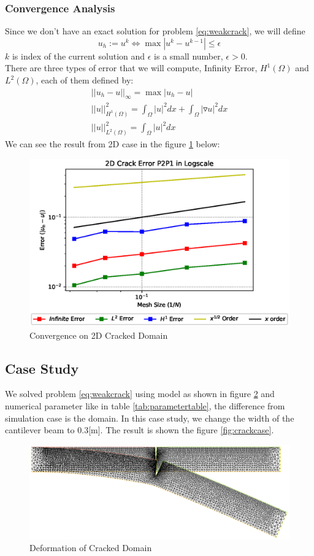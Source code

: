 \documentclass[a4paper,11pt]{article}
\begin{document}
\subsubsection{Convergence Analysis}
Since we don't have an exact solution for problem \eqref{eq:weakcrack}, we will define $$u_h:= u^k \iff \max|u^k-u^{k-1}| \leq \epsilon$$ $k$ is index of the current solution and $\epsilon$ is a small number, $\epsilon > 0$.\\
There are three types of error that we will compute, Infinity Error, $H^1(\Omega)$ and $L^2(\Omega)$, each of them defined by:
\begin{eqnarray}
||u_h - u||_\infty = \max|u_h-u|\\
||u||^2_{H^1(\Omega)} = \int_\Omega |u|^2 dx + \int_\Omega |\triangledown u|^2 dx\\
||u||^2_{L^2(\Omega)} = \int_\Omega |u|^2 dx
\end{eqnarray}
We can see the result from 2D case in the figure \ref{fig:all2dcrackerror} below:
\begin{figure}[h!]
	\centering
	\includegraphics[width=0.7\linewidth]{picture/conference/crackerrP2P1}
	\caption{Convergence on 2D Cracked Domain}
	\label{fig:all2dcrackerror}
\end{figure}
\newline
\newpage
\subsection{Case Study}
We solved problem \eqref{eq:weakcrack} using model as shown in figure \ref{fig:mesh-deform-case} and numerical parameter like in table \ref{tab:parametertable}, the difference from simulation case is the domain. In this case study, we change the width of the cantilever beam to 0.3[m]. The result is shown the figure \ref{fig:crackcase}.

\begin{figure}[h!]
	\centering
	\includegraphics[width=\linewidth]{picture/conference/mesh-deform-case}
	\caption{Deformation of Cracked Domain}
	\label{fig:mesh-deform-case}
\end{figure}
\end{document}
